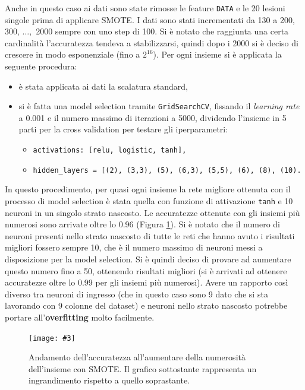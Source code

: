 \documentclass[12pt, twoside, letterpaper]{report}
\newcommand{\imgh}[4] {
	\begin{figure}[h]
		\centering
		\texttt{[image: \#3]}\\
		\caption{#1}
		\label{fig:#4}
	\end{figure}
}
\begin{document}
			Anche in questo caso ai dati sono state rimosse le feature \texttt{DATA} e le 20 lesioni singole prima di applicare SMOTE. I dati sono stati incrementati da 130 a 200, 300, $\dots,$ 2000 sempre con uno step di 100. Si è notato che raggiunta una certa cardinalità l'accuratezza tendeva a stabilizzarsi, quindi dopo i 2000 si è deciso di crescere in modo esponenziale (fino a $2^{16}$). Per ogni insieme si è applicata la seguente procedura:
				\begin{itemize}
				 \item è stata applicata ai dati la scalatura standard,
				 \item si è fatta una model selection tramite \texttt{GridSearchCV}, fissando il \textit{learning rate} a 0.001 e il numero massimo di iterazioni a 5000, dividendo l'insieme in 5 parti per la cross validation per testare gli iperparametri:
				 	\begin{itemize}
					\item \texttt{activations: [relu, logistic, tanh],}
    				\item \texttt{hidden\_layers = [(2), (3,3), (5), (6,3), (5,5), (6), (8), (10).}
					\end{itemize}
				 \end{itemize}
			In questo procedimento, per quasi ogni insieme la rete migliore ottenuta con il processo di model selection è stata quella con funzione di attivazione \texttt{tanh} e 10 neuroni in un singolo strato nascosto. Le accuratezze ottenute con gli insiemi più numerosi sono arrivate oltre lo 0.96 (Figura \ref{fig:accuracy_smote}). Si è notato che il numero di neuroni presenti nello strato nascosto di tutte le reti che hanno avuto i risultati migliori fossero sempre 10, che è il numero massimo di neuroni messi a disposizione per la model selection. Si è quindi deciso di provare ad aumentare questo numero fino a 50, ottenendo risultati migliori (si è arrivati ad ottenere accuratezze oltre lo 0.99 per gli insiemi più numerosi). Avere un rapporto così diverso tra neuroni di ingresso (che in questo caso sono 9 dato che si sta lavorando con 9 colonne del dataset) e neuroni nello strato nascosto potrebbe portare all'\textbf{overfitting} molto facilmente.
			\imgh{Andamento dell'accuratezza all'aumentare della numerosità dell'insieme con SMOTE. Il grafico sottostante rappresenta un ingrandimento rispetto a quello soprastante.}{0.35}{accuracy_smote_1.png}{accuracy_smote}
			
\end{document}

